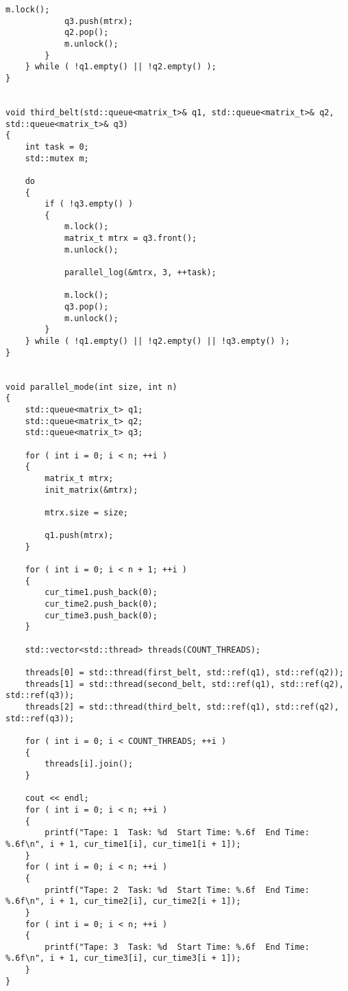 \begin{center}
\begin{lstlisting}[label=lst:conveyor,caption=Реализация конвейерного алгоритма обработки матриц]
			m.lock();
			q3.push(mtrx);
			q2.pop();
			m.unlock();
		}
	} while ( !q1.empty() || !q2.empty() );
}


void third_belt(std::queue<matrix_t>& q1, std::queue<matrix_t>& q2, std::queue<matrix_t>& q3)
{
	int task = 0;
	std::mutex m;
	
	do
	{
		if ( !q3.empty() )
		{
			m.lock();
			matrix_t mtrx = q3.front();
			m.unlock();
			
			parallel_log(&mtrx, 3, ++task);
			
			m.lock();
			q3.pop();
			m.unlock();
		}
	} while ( !q1.empty() || !q2.empty() || !q3.empty() );
}


void parallel_mode(int size, int n)
{
	std::queue<matrix_t> q1;
	std::queue<matrix_t> q2;
	std::queue<matrix_t> q3;
	
	for ( int i = 0; i < n; ++i )
	{
		matrix_t mtrx;
		init_matrix(&mtrx);
		
		mtrx.size = size;
		
		q1.push(mtrx);
	}
	
	for ( int i = 0; i < n + 1; ++i )
	{
		cur_time1.push_back(0);
		cur_time2.push_back(0);
		cur_time3.push_back(0);
	}
	
	std::vector<std::thread> threads(COUNT_THREADS);
	
	threads[0] = std::thread(first_belt, std::ref(q1), std::ref(q2));
	threads[1] = std::thread(second_belt, std::ref(q1), std::ref(q2), std::ref(q3));
	threads[2] = std::thread(third_belt, std::ref(q1), std::ref(q2), std::ref(q3));
	
	for ( int i = 0; i < COUNT_THREADS; ++i )
	{
		threads[i].join();
	}
	
	cout << endl;
	for ( int i = 0; i < n; ++i )
	{
		printf("Tape: 1  Task: %d  Start Time: %.6f  End Time: %.6f\n", i + 1, cur_time1[i], cur_time1[i + 1]);
	}
	for ( int i = 0; i < n; ++i )
	{
		printf("Tape: 2  Task: %d  Start Time: %.6f  End Time: %.6f\n", i + 1, cur_time2[i], cur_time2[i + 1]);
	}
	for ( int i = 0; i < n; ++i )
	{
		printf("Tape: 3  Task: %d  Start Time: %.6f  End Time: %.6f\n", i + 1, cur_time3[i], cur_time3[i + 1]);
	}
}

\end{lstlisting} 
\end{center}

